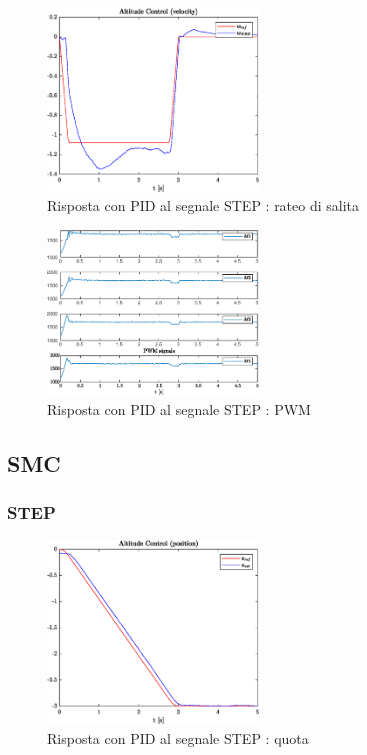 \begin{figure}
	\centering
	\includegraphics[width=0.5\textwidth]{Simulazioni/Figure/PID/STEP/AltitudeControlVel}
	\caption{Risposta con PID al segnale STEP : rateo di salita}
\end{figure}

\begin{figure}
	\centering
	\includegraphics[width=0.5\textwidth]{Simulazioni/Figure/PID/STEP/PWM}
	\caption{Risposta con PID al segnale STEP : PWM}
\end{figure}

\clearpage
\subsection{SMC}
\subsubsection{STEP}
\begin{figure}
	\centering
	\includegraphics[width=0.5\textwidth]{Simulazioni/Figure/SMC/STEP/AltitudeControlPos}
	\caption{Risposta con PID al segnale STEP : quota}
\end{figure}

